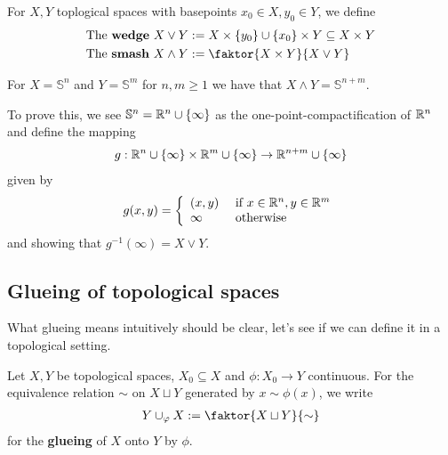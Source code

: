 \begin{dfn}
For $X, Y$ toplogical spaces with basepoints $x_0 \in X, y_0 \in Y$, we define
\begin{align*}
  \text{The \textbf{wedge} } X \vee Y &:= X \times \{y_0\} \cup \{x_0\} \times Y \subseteq X \times Y\\
  \text{The \textbf{smash} } X \wedge Y &:= \faktor{X \times Y}{X \vee Y}
\end{align*}
\end{dfn}

\begin{ex}[]
  For $X = \mathbb{S}^{n}$ and $Y = \mathbb{S}^{m}$ for $n,m \geq 1$ we have that $X \wedge Y = \mathbb{S}^{n+m}$.

To prove this, we see $\mathbb{S}^{n} = \mathbb{R}^{n} \cup \{\infty\}$ as the one-point-compactification of $\mathbb{R}^{n}$ and define the mapping \begin{align*}
  g: \mathbb{R}^{n} \cup \{\infty\} \times \mathbb{R}^{m} \cup \{\infty\} \to \mathbb{R}^{n+m} \cup \{\infty\}
\end{align*}
given by
\begin{align*}
  g(x,y) =
  \left\{\begin{array}{ll}
      (x,y)  & \text{ if } x \in \mathbb{R}^{n}, y \in \mathbb{R}^{m}\\
     \infty& \text{ otherwise}
  \end{array} \right.
\end{align*}
and showing that $g^{-1}(\infty) = X \vee Y$.
\end{ex}

\subsection{Glueing of topological spaces}
What glueing means intuitively should be clear, let's see if we can define it in a topological setting.

\begin{dfn}[]
Let $X,Y$ be topological spaces, $X_0 \subseteq X$ and $\phi: X_0 \to  Y$ continuous.
For the equivalence relation $\sim$ on $X \sqcup Y$ generated by $x \sim \phi(x)$, we write
\begin{align*}
  Y \cup_{\phi} X := \faktor{X \sqcup Y}{\sim}
\end{align*}
for the \textbf{glueing} of $X$ onto $Y$ by $\phi$.
\end{dfn}

